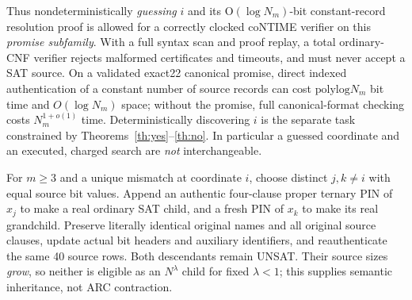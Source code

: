 \documentclass[11pt]{article}
\begin{document}
Thus nondeterministically \emph{guessing} $i$ and its O$(\log N_m)$-bit
constant-record resolution proof is allowed for a correctly clocked
coNTIME verifier on this \emph{promise subfamily}. With a full syntax
scan and proof replay, a total ordinary-CNF verifier rejects malformed
certificates and timeouts, and must never accept a SAT source.
On a validated exact22 canonical promise, direct indexed
authentication of a constant number of source records can cost
$\mathrm{polylog}N_m$ bit time and $O(\log N_m)$ space; without the promise,
full canonical-format checking costs $N_m^{1+o(1)}$ time.
Deterministically discovering $i$ is the separate task constrained by
Theorems~\ref{th:yes}--\ref{th:no}. In particular a guessed coordinate
and an executed, charged search are \emph{not} interchangeable.

For $m\ge3$ and a unique mismatch at coordinate $i$, choose
distinct $j,k\ne i$ with equal source bit values. Append
an authentic four-clause proper ternary PIN of $x_j$ to make
a real ordinary SAT child, and a fresh PIN of $x_k$ to make
its real grandchild. Preserve literally identical original names
and all original source clauses, update actual bit headers and
auxiliary identifiers, and reauthenticate the same 40 source rows.
Both descendants remain UNSAT. Their source sizes \emph{grow},
so neither is eligible as an $N^\lambda$ child for fixed $\lambda<1$;
this supplies semantic inheritance, not ARC contraction.
\end{document}
